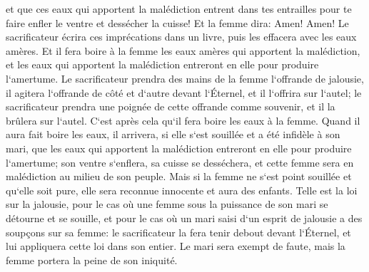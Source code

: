 \verse et que ces eaux qui apportent la malédiction entrent dans tes entrailles pour te faire enfler le ventre et dessécher la cuisse! Et la femme dira: Amen! Amen! 
\verse Le sacrificateur écrira ces imprécations dans un livre, puis les effacera avec les eaux amères. 
\verse Et il fera boire à la femme les eaux amères qui apportent la malédiction, et les eaux qui apportent la malédiction entreront en elle pour produire l`amertume. 
\verse Le sacrificateur prendra des mains de la femme l`offrande de jalousie, il agitera l`offrande de côté et d`autre devant l`Éternel, et il l`offrira sur l`autel; 
\verse le sacrificateur prendra une poignée de cette offrande comme souvenir, et il la brûlera sur l`autel. C`est après cela qu`il fera boire les eaux à la femme. 
\verse Quand il aura fait boire les eaux, il arrivera, si elle s`est souillée et a été infidèle à son mari, que les eaux qui apportent la malédiction entreront en elle pour produire l`amertume; son ventre s`enflera, sa cuisse se desséchera, et cette femme sera en malédiction au milieu de son peuple. 
\verse Mais si la femme ne s`est point souillée et qu`elle soit pure, elle sera reconnue innocente et aura des enfants. 
\verse Telle est la loi sur la jalousie, pour le cas où une femme sous la puissance de son mari se détourne et se souille, 
\verse et pour le cas où un mari saisi d`un esprit de jalousie a des soupçons sur sa femme: le sacrificateur la fera tenir debout devant l`Éternel, et lui appliquera cette loi dans son entier. 
\verse Le mari sera exempt de faute, mais la femme portera la peine de son iniquité. 

\chapter{}

